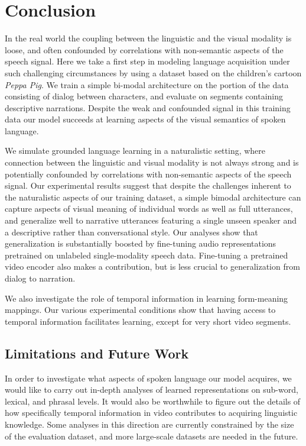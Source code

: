 \section{Conclusion}
\label{sec:conclusion}
In the real world
the coupling between the linguistic and the visual modality is
loose, and often confounded by correlations with non-semantic
aspects of the speech signal. Here we take a first step in modeling language 
acquisition under such challenging circumstances by
using a dataset based on the children's cartoon {\it Peppa Pig}.  We
train a simple bi-modal architecture on the portion of the data
consisting of dialog between characters, and evaluate on segments
containing descriptive narrations. Despite the weak and confounded
signal in this training data our model succeeds at learning aspects
of the visual semantics of spoken language.
  
We simulate grounded language learning in a naturalistic setting, where 
connection between the linguistic and visual modality is not always strong 
and is potentially confounded by correlations with non-semantic aspects of 
the speech signal. Our experimental results suggest that despite the 
challenges inherent to the naturalistic aspects of our training dataset, a 
simple bimodal architecture can capture aspects of visual meaning of individual 
words as well as full utterances, and generalize well to narrative utterances
featuring a single unseen speaker and a descriptive rather than
conversational style. Our analyses show that generalization is substantially
boosted by fine-tuning audio representations pretrained on unlabeled
single-modality speech data. Fine-tuning a pretrained video encoder
also makes a contribution, but is less crucial to generalization from
dialog to narration.

We also investigate the role of temporal information in learning form-meaning 
mappings. Our various experimental conditions show that having access to 
temporal information facilitates learning, except for very short video segments.

\subsection{Limitations and Future Work}
\label{sec:limitations}

In order to investigate what aspects of spoken language our model
acquires, we would like to carry out in-depth analyses of learned
representations on sub-word, lexical, and phrasal levels. It would
also be worthwhile to figure out the details of how specifically
temporal information in video contributes to acquiring linguistic
knowledge.  Some analyses in this direction are currently constrained
by the size of the evaluation dataset, and more large-scale datasets
are needed in the future.

